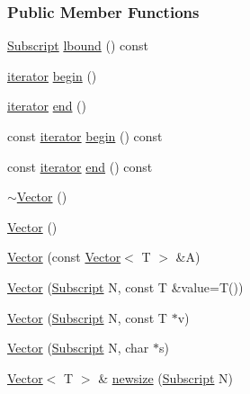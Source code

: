 \subsubsection*{Public Member Functions}
\begin{DoxyCompactItemize}
\item 
\hyperlink{namespace_t_n_t_af22e3f1460e145c04ce4e7d701e4c1c1}{Subscript} \hyperlink{class_t_n_t_1_1_vector_a3bc6d4e9cd23b701e377c63fd26c3fcc}{lbound} () const 
\item 
\hyperlink{class_t_n_t_1_1_vector_a7289b2334c4c28181bb4193fa32fc48a}{iterator} \hyperlink{class_t_n_t_1_1_vector_a8be20c12f428f0762ff546d7146141a1}{begin} ()
\item 
\hyperlink{class_t_n_t_1_1_vector_a7289b2334c4c28181bb4193fa32fc48a}{iterator} \hyperlink{class_t_n_t_1_1_vector_a3cf2f31a09a1d5b001e073a07fe13b72}{end} ()
\item 
const \hyperlink{class_t_n_t_1_1_vector_a7289b2334c4c28181bb4193fa32fc48a}{iterator} \hyperlink{class_t_n_t_1_1_vector_ab4495967c00381468e3577bdc9023378}{begin} () const 
\item 
const \hyperlink{class_t_n_t_1_1_vector_a7289b2334c4c28181bb4193fa32fc48a}{iterator} \hyperlink{class_t_n_t_1_1_vector_ad1097f1e627d1d1e20807b2d7e1c6f78}{end} () const 
\item 
\hyperlink{class_t_n_t_1_1_vector_a29e491d8f3a77612be73b6b69c04f060}{$\sim$Vector} ()
\item 
\hyperlink{class_t_n_t_1_1_vector_a55481f65669664062299cef9a44f9e2e}{Vector} ()
\item 
\hyperlink{class_t_n_t_1_1_vector_a271230d277812e5233ba912bd5932edc}{Vector} (const \hyperlink{class_t_n_t_1_1_vector}{Vector}$<$ T $>$ \&A)
\item 
\hyperlink{class_t_n_t_1_1_vector_aa329e3e0b9ef92bed1958b31d16742e2}{Vector} (\hyperlink{namespace_t_n_t_af22e3f1460e145c04ce4e7d701e4c1c1}{Subscript} N, const T \&value=T())
\item 
\hyperlink{class_t_n_t_1_1_vector_ac4709b0750a97e66ecd1ffbf9e45a8ea}{Vector} (\hyperlink{namespace_t_n_t_af22e3f1460e145c04ce4e7d701e4c1c1}{Subscript} N, const T $\ast$v)
\item 
\hyperlink{class_t_n_t_1_1_vector_a89ae28b74f28b6ba72fbc425937d3603}{Vector} (\hyperlink{namespace_t_n_t_af22e3f1460e145c04ce4e7d701e4c1c1}{Subscript} N, char $\ast$s)
\item 
\hyperlink{class_t_n_t_1_1_vector}{Vector}$<$ T $>$ \& \hyperlink{class_t_n_t_1_1_vector_a6c02daa35702d244ca08c079ba490864}{newsize} (\hyperlink{namespace_t_n_t_af22e3f1460e145c04ce4e7d701e4c1c1}{Subscript} N)

\end{DoxyCompactItemize}
